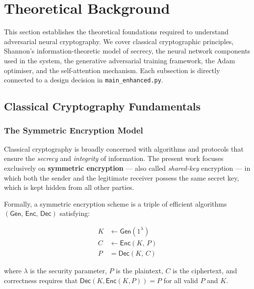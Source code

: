 \documentclass[12pt, a4paper]{article}
\newcommand{\code}[1]{\texttt{\color{CodeRed}#1}}
\begin{document}
\section{Theoretical Background}
\label{sec:background}

This section establishes the theoretical foundations required to understand
adversarial neural cryptography. We cover classical cryptographic principles,
Shannon's information-theoretic model of secrecy, the neural network
components used in the system, the generative adversarial training framework,
the Adam optimiser, and the self-attention mechanism. Each subsection is
directly connected to a design decision in \code{main\_enhanced.py}.

\subsection{Classical Cryptography Fundamentals}
\label{subsec:classical}

\subsubsection*{The Symmetric Encryption Model}

Classical cryptography is broadly concerned with algorithms and protocols
that ensure the \emph{secrecy} and \emph{integrity} of information. The
present work focuses exclusively on \textbf{symmetric encryption} — also
called \emph{shared-key} encryption — in which both the sender and the
legitimate receiver possess the same secret key, which is kept hidden from
all other parties.

Formally, a symmetric encryption scheme is a triple of efficient algorithms
$(\mathsf{Gen},\, \mathsf{Enc},\, \mathsf{Dec})$ satisfying:

\begin{align}
  K     &\leftarrow \mathsf{Gen}(1^\lambda)
         \tag{key generation} \\[4pt]
  C     &\leftarrow \mathsf{Enc}(K,\, P)
         \tag{encryption} \\[4pt]
  P     &= \mathsf{Dec}(K,\, C)
         \tag{decryption}
\end{align}

\noindent where $\lambda$ is the security parameter, $P$ is the plaintext,
$C$ is the ciphertext, and correctness requires that
$\mathsf{Dec}(K, \mathsf{Enc}(K, P)) = P$ for all valid $P$ and $K$.
\end{document}
